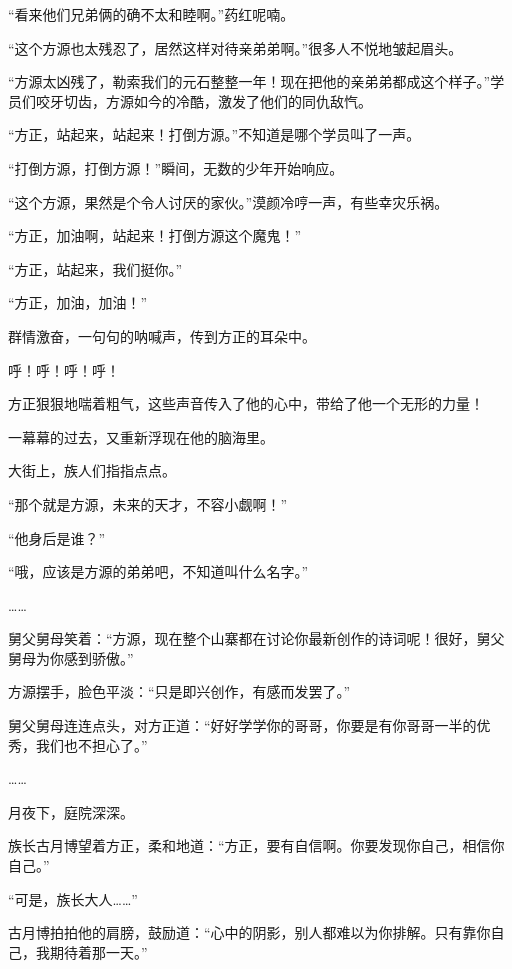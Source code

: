 
\begin{this_body}



“看来他们兄弟俩的确不太和睦啊。”药红呢喃。

“这个方源也太残忍了，居然这样对待亲弟弟啊。”很多人不悦地皱起眉头。

“方源太凶残了，勒索我们的元石整整一年！现在把他的亲弟弟都成这个样子。”学员们咬牙切齿，方源如今的冷酷，激发了他们的同仇敌忾。

“方正，站起来，站起来！打倒方源。”不知道是哪个学员叫了一声。

“打倒方源，打倒方源！”瞬间，无数的少年开始响应。

“这个方源，果然是个令人讨厌的家伙。”漠颜冷哼一声，有些幸灾乐祸。

“方正，加油啊，站起来！打倒方源这个魔鬼！”

“方正，站起来，我们挺你。”

“方正，加油，加油！”

群情激奋，一句句的呐喊声，传到方正的耳朵中。

呼！呼！呼！呼！

方正狠狠地喘着粗气，这些声音传入了他的心中，带给了他一个无形的力量！

一幕幕的过去，又重新浮现在他的脑海里。

大街上，族人们指指点点。

“那个就是方源，未来的天才，不容小觑啊！”

“他身后是谁？”

“哦，应该是方源的弟弟吧，不知道叫什么名字。”

……

舅父舅母笑着：“方源，现在整个山寨都在讨论你最新创作的诗词呢！很好，舅父舅母为你感到骄傲。”

方源摆手，脸色平淡：“只是即兴创作，有感而发罢了。”

舅父舅母连连点头，对方正道：“好好学学你的哥哥，你要是有你哥哥一半的优秀，我们也不担心了。”

……

月夜下，庭院深深。

族长古月博望着方正，柔和地道：“方正，要有自信啊。你要发现你自己，相信你自己。”

“可是，族长大人……”

古月博拍拍他的肩膀，鼓励道：“心中的阴影，别人都难以为你排解。只有靠你自己，我期待着那一天。”


\end{this_body}
